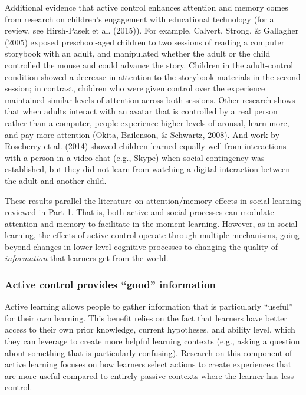 \documentclass[a4paper,man,apacite,floatsintext]{apa6}
\begin{document}
Additional evidence that active control enhances attention and memory
comes from research on children's engagement with educational technology
(for a review, see Hirsh-Pasek et al. (2015)). For example, Calvert,
Strong, \& Gallagher (2005) exposed preschool-aged children to two
sessions of reading a computer storybook with an adult, and manipulated
whether the adult or the child controlled the mouse and could advance
the story. Children in the adult-control condition showed a decrease in
attention to the storybook materials in the second session; in contrast,
children who were given control over the experience maintained similar
levels of attention across both sessions. Other research shows that when
adults interact with an avatar that is controlled by a real person
rather than a computer, people experience higher levels of arousal,
learn more, and pay more attention (Okita, Bailenson, \& Schwartz,
2008). And work by Roseberry et al. (2014) showed children learned
equally well from interactions with a person in a video chat (e.g.,
Skype) when social contingency was established, but they did not learn
from watching a digital interaction between the adult and another child.

These results parallel the literature on attention/memory effects in
social learning reviewed in Part 1. That is, both active and social
processes can modulate attention and memory to facilitate in-the-moment
learning. However, as in social learning, the effects of active control
operate through multiple mechanisms, going beyond changes in lower-level
cognitive processes to changing the quality of \emph{information} that
learners get from the world.

\subsubsection{\texorpdfstring{Active control provides ``good''
information}{Active control provides good information}}\label{active-control-provides-good-information}

Active learning allows people to gather information that is particularly
``useful'' for their own learning. This benefit relies on the fact that
learners have better access to their own prior knowledge, current
hypotheses, and ability level, which they can leverage to create more
helpful learning contexts (e.g., asking a question about something that
is particularly confusing). Research on this component of active
learning focuses on how learners select actions to create experiences
that are more useful compared to entirely passive contexts where the
learner has less control.
\end{document}
